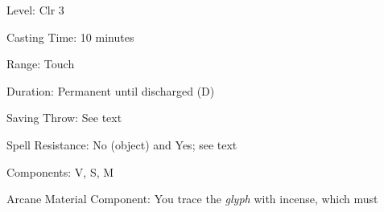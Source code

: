 
\begin{description*}
\item[Level:] Clr 3
\item[Casting Time:] 10 minutes
\item[Range:] Touch
\item[Duration:] Permanent until discharged (D)
\item[Saving Throw:] See text
\item[Spell Resistance:] No (object) and Yes; see text
\item[Components:] V, S, M
\item[Arcane Material Component:] You trace the \textit{glyph} with incense, which must
\end{description*}

